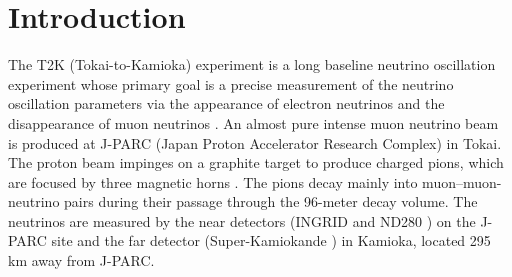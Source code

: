 \documentclass[%
 reprint,
superscriptaddress,
 amsmath,amssymb,
 aps,
]{revtex4-1}
\begin{document}
\begin{abstract}
We report a measurement of the $\nu_\mu$ charged current quasi-elastic cross-sections on carbon in the T2K on-axis neutrino beam.
The measured charged current quasi-elastic cross-sections on carbon at mean neutrino energies of 1.94~GeV and 0.93~GeV are
$(11.95\pm 0.19(stat.)_{-1.47}^{+1.82}
(syst.))\times 10^{-39}\mathrm{cm}^2/\mathrm{neutron}$,
and $(10.64\pm 0.37(stat.)_{-1.65}^{+2.03}
(syst.))\times 10^{-39}\mathrm{cm}^2/\mathrm{neutron}$, respectively. These results agree well with the predictions of neutrino interaction models.
In addition, we investigated the effects of the nuclear model and the multi-nucleon interaction.



\end{abstract}

\maketitle



\section{Introduction}\label{sec:introduction}
The T2K (Tokai-to-Kamioka) experiment is a long baseline neutrino oscillation experiment \cite{t2k_nim} whose primary goal is
a precise measurement of the neutrino oscillation parameters via the appearance of electron neutrinos and the disappearance of muon neutrinos \cite{t2k_joint_oa}.
An almost pure intense muon neutrino beam is produced at J-PARC (Japan Proton Accelerator Research Complex) in Tokai.
The proton beam impinges on a graphite target to produce charged pions, which are focused by three magnetic horns \cite{horn_ichikawa}. The pions decay mainly into muon--muon-neutrino pairs during their passage through the 96-meter decay volume.
The neutrinos are measured by the near detectors (INGRID \cite{ingrid_nim} and ND280 \cite{p0d_nim,tpc_abgrall,fgd_amaudruz,ecal_jinst,smrd_nim}) on the J-PARC site and the far detector (Super-Kamiokande \cite{sk_detector}) in Kamioka, located 295\,km away from J-PARC.
\end{document}
